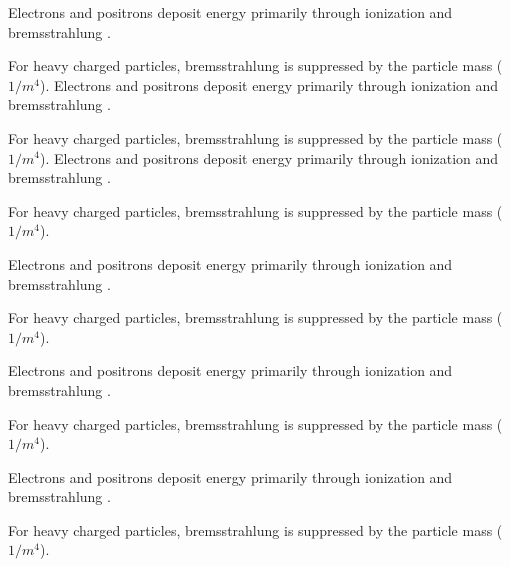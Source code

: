 Electrons and positrons deposit energy primarily through ionization and \gls{bremsstrahlung} \parencite{kolanoski16}.

For heavy charged particles, \gls{bremsstrahlung} is suppressed by the particle mass ($1/m^4$).
Electrons and positrons deposit energy primarily through ionization and \gls{bremsstrahlung} \parencite{kolanoski16}.

For heavy charged particles, \gls{bremsstrahlung} is suppressed by the particle mass ($1/m^4$).
Electrons and positrons deposit energy primarily through ionization and \gls{bremsstrahlung} \parencite{kolanoski16}.

For heavy charged particles, \gls{bremsstrahlung} is suppressed by the particle mass ($1/m^4$).
\begin{frame}[t]
Electrons and positrons deposit energy primarily through ionization and \gls{bremsstrahlung} \parencite{kolanoski16}.

For heavy charged particles, \gls{bremsstrahlung} is suppressed by the particle mass ($1/m^4$).
\end{frame}

\begin{frame}[t]
Electrons and positrons deposit energy primarily through ionization and \gls{bremsstrahlung} \parencite{kolanoski16}.

For heavy charged particles, \gls{bremsstrahlung} is suppressed by the particle mass ($1/m^4$).
\end{frame}

\begin{frame}[t]
Electrons and positrons deposit energy primarily through ionization and \gls{bremsstrahlung} \parencite{kolanoski16}.

For heavy charged particles, \gls{bremsstrahlung} is suppressed by the particle mass ($1/m^4$).
\end{frame}

